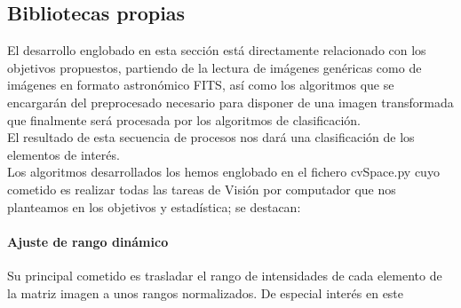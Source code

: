 	\subsection{Bibliotecas propias}\label{ownLib}
	El desarrollo englobado en esta sección está directamente relacionado con los objetivos propuestos, partiendo de la lectura de imágenes genéricas como de imágenes en formato astronómico FITS, así como los algoritmos que se encargarán del preprocesado necesario para disponer de una imagen transformada que finalmente será procesada por los algoritmos de clasificación.\\
	El resultado de esta secuencia de procesos nos dará una clasificación de los elementos de interés. \\
	Los algoritmos desarrollados los hemos englobado en el fichero cvSpace.py cuyo cometido es realizar todas las tareas de Visión por computador que nos planteamos en los objetivos y estadística; se destacan:
	\paragraph{Ajuste de rango dinámico}
	Su principal cometido es trasladar el rango de intensidades de cada elemento de la matriz imagen a unos rangos normalizados. De especial interés en este \\
	

